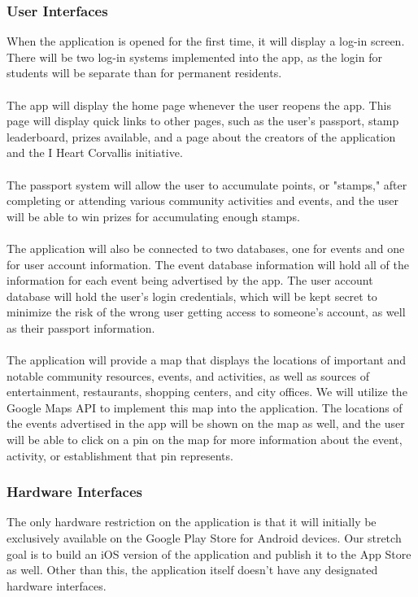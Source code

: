 \documentclass[draftclsnofoot, onecolumn, 10pt, compsoc]{IEEEtran}
\begin{document}
			\subsubsection{User Interfaces}
				When the application is opened for the first time, it will display a log-in screen. There will be two log-in systems implemented into the app, as the login for students will be separate than for permanent residents. \\ \\
				The app will display the home page whenever the user reopens the app. This page will display quick links to other pages, such as the user's passport, stamp leaderboard, prizes available, and a page about the creators of the application and the I Heart Corvallis initiative. \\ \\
				The passport system will allow the user to accumulate points, or "stamps," after completing or attending various community activities and events, and the user will be able to win prizes for accumulating enough stamps. \\ \\
				The application will also be connected to two databases, one for events and one for user account information. The event database information will hold all of the information for each event being advertised by the app. The user account database will hold the user's login credentials, which will be kept secret to minimize the risk of the wrong user getting access to someone's account, as well as their passport information. \\ \\
				The application will provide a map that displays the locations of important and notable community resources, events, and activities, as well as sources of entertainment, restaurants, shopping centers, and city offices. We will utilize the Google Maps API to implement this map into the application. The locations of the events advertised in the app will be shown on the map as well, and the user will be able to click on a pin on the map for more information about the event, activity, or establishment that pin represents.

			\subsubsection{Hardware Interfaces}
				The only hardware restriction on the application is that it will initially be exclusively available on the Google Play Store for Android devices. Our stretch goal is to build an iOS version of the application and publish it to the App Store as well. Other than this, the application itself doesn't have any designated hardware interfaces.
\end{document}
